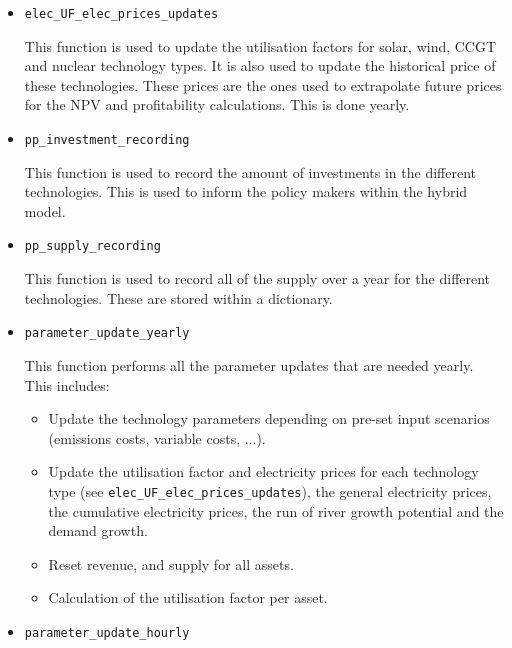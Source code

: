 \begin{itemize}
\begin{itemize}
	If the asset has completed its construction time, it is added to the list of online assets for electricity generation.
	\end{itemize}
	
	{\bfseries Not that with this loop, one assumes that the process for all technology types (solar, wind and CCGT) is the same.}

\item \texttt{elec\_UF\_elec\_prices\_updates}

This function is used to update the utilisation factors for solar, wind, CCGT and nuclear technology types. It is also used to update the historical price of these technologies. These prices are the ones used to extrapolate future prices for the NPV and profitability calculations. This is done yearly.

\item \texttt{pp\_investment\_recording}

This function is used to record the amount of investments in the different technologies.  This is used to inform the policy makers within the hybrid model.

\item \texttt{pp\_supply\_recording}

This function is used to record all of the supply over a year for the different technologies. These are stored within a dictionary.

\item \texttt{parameter\_update\_yearly}

This function performs all the parameter updates that are needed yearly. This includes:

\begin{itemize}
\item Update the technology parameters depending on pre-set input scenarios (emissions costs, variable costs, ...).
\item Update the utilisation factor and electricity prices for each technology type (see \texttt{elec\_UF\_elec\_prices\_updates}), the general electricity prices, the cumulative electricity prices, the run of river growth potential and the demand growth.
\item Reset revenue, and supply for all assets.
\item Calculation of the utilisation factor per asset.
\end{itemize}

\item \texttt{parameter\_update\_hourly}


\end{itemize}
